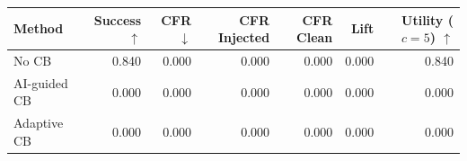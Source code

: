 \begin{tabular}{lrrrrrr}
\toprule
Method & Success $\uparrow$ & CFR $\downarrow$ & CFR Injected & CFR Clean & Lift & Utility ($c=5$) $\uparrow$ \\
\midrule
No CB & 0.840 & 0.000 & 0.000 & 0.000 & 0.000 & 0.840 \\
AI-guided CB & 0.000 & 0.000 & 0.000 & 0.000 & 0.000 & 0.000 \\
Adaptive CB & 0.000 & 0.000 & 0.000 & 0.000 & 0.000 & 0.000 \\
\bottomrule
\end{tabular}
